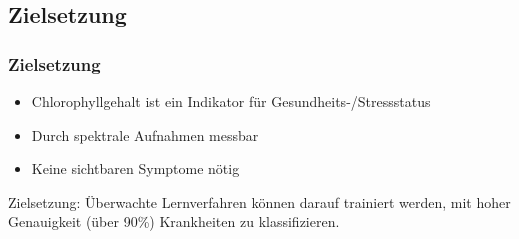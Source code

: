 \documentclass{beamer}
\begin{document}

\begin{frame}\section{Zielsetzung}\frametitle{Zielsetzung}
	\begin{itemize}
		\item Chlorophyllgehalt ist ein Indikator für Gesundheits-/Stressstatus
		\item Durch spektrale Aufnahmen messbar
		\item Keine sichtbaren Symptome nötig
	\end{itemize}
	Zielsetzung: Überwachte Lernverfahren können darauf trainiert werden, mit hoher Genauigkeit (über 90\%) Krankheiten zu klassifizieren.
\end{frame}
\end{document}
